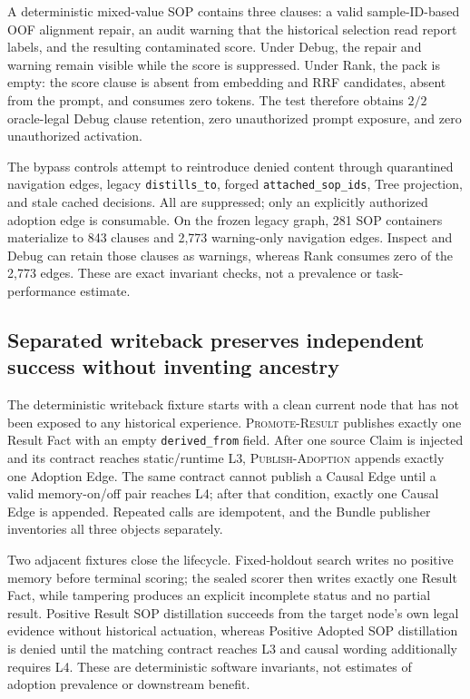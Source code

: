 \documentclass{article}
\begin{document}
A deterministic mixed-value SOP contains three clauses: a valid
sample-ID-based OOF alignment repair, an audit warning that the historical
selection read report labels, and the resulting contaminated score.  Under
Debug, the repair and warning remain visible while the score is suppressed.
Under Rank, the pack is empty: the score clause is absent from embedding and
RRF candidates, absent from the prompt, and consumes zero tokens.  The test
therefore obtains $2/2$ oracle-legal Debug clause retention, zero unauthorized
prompt exposure, and zero unauthorized activation.

The bypass controls attempt to reintroduce denied content through quarantined
navigation edges, legacy \texttt{distills\_to}, forged
\texttt{attached\_sop\_ids}, Tree projection, and stale cached decisions.  All
are suppressed; only an explicitly authorized adoption edge is consumable.
On the frozen legacy graph, 281 SOP containers materialize to 843 clauses and
2,773 warning-only navigation edges.  Inspect and Debug can retain those clauses
as warnings, whereas Rank consumes zero of the 2,773 edges.  These are exact
invariant checks, not a prevalence or task-performance estimate.

\subsection{Separated writeback preserves independent success without inventing ancestry}

The deterministic writeback fixture starts with a clean current node that has
not been exposed to any historical experience.  \textsc{Promote-Result}
publishes exactly one Result Fact with an empty \texttt{derived\_from} field.
After one source Claim is injected and its contract reaches static/runtime L3,
\textsc{Publish-Adoption} appends exactly one Adoption Edge.  The same contract
cannot publish a Causal Edge until a valid memory-on/off pair reaches L4; after
that condition, exactly one Causal Edge is appended.  Repeated calls are
idempotent, and the Bundle publisher inventories all three objects separately.

Two adjacent fixtures close the lifecycle.  Fixed-holdout search writes no
positive memory before terminal scoring; the sealed scorer then writes exactly
one Result Fact, while tampering produces an explicit incomplete status and no
partial result.  Positive Result SOP distillation succeeds from the target
node's own legal evidence without historical actuation, whereas Positive
Adopted SOP distillation is denied until the matching contract reaches L3 and
causal wording additionally requires L4.  These are deterministic software
invariants, not estimates of adoption prevalence or downstream benefit.
\end{document}
